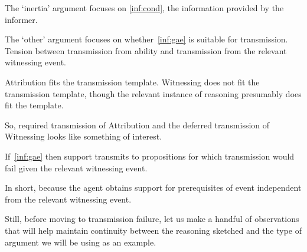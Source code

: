 \documentclass[10pt]{article}
\newcommand{\WR}[0]{\textsf{Witnessing}}
\newcommand{\AR}[0]{\textsf{Attribution}}
\begin{document}
\begin{note}
  The `inertia' argument focuses on \ref{inf:cond}, the information provided by the informer.

  The `other' argument focuses on whether~\ref{inf:gae} is suitable for transmission.
  Tension between transmission from ability and transmission from the relevant witnessing event.
\end{note}

\begin{note}
  \AR{} fits the transmission template.
  \WR{} does not fit the transmission template, though the relevant instance of reasoning presumably does fit the template.

  So, required transmission of \AR{} and the deferred transmission of \WR{} looks like something of interest.
\end{note}

\begin{note}[Still]
  If~\ref{inf:gae} then support transmits to propositions for which transmission would fail given the relevant witnessing event.

  In short, because the agent obtains support for prerequisites of event independent from the relevant witnessing event.
\end{note}

\begin{note}
  Still, before moving to transmission failure, let us make a handful of observations that will help maintain continuity between the reasoning sketched and the type of argument we will be using as an example.
\end{note}
\end{document}
